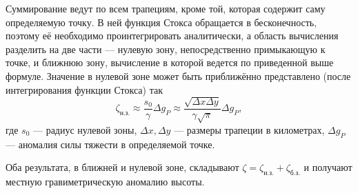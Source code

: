\documentclass[11pt, a4paper,addpoints]{exam}
\theoremstyle{remark}
\begin{document}
\begin{questions}
    Суммирование ведут по всем трапециям, кроме той, которая содержит саму определяемую точку. В ней
    функция Стокса обращается в бесконечность, поэтому её необходимо проинтегрировать аналитически,
    а область вычисления разделить на две части --- нулевую зону, непосредственно примыкающую к точке, и
    ближнюю зону, вычисление в которой ведется по приведенной выше формуле. 
    Значение в нулевой зоне может быть приближённо представлено (после интегрирования функции
    Стокса) так
    \begin{equation*}
        \zeta_{\textrm{н.з.}} \approx \dfrac{s_0}{\gamma} \Delta g_P \approx \dfrac{\sqrt{\Delta x\Delta
        y}}{\gamma \sqrt{\pi}} \Delta g_P,
    \end{equation*}
    где $s_0$ --- радиус нулевой зоны, $\Delta x, \Delta y$ --- размеры трапеции в километрах,
    $\Delta g_P$ --- аномалия силы тяжести в определяемой точке. 

    Оба результата, в ближней и нулевой зоне, складывают $\zeta = \zeta_{\textrm{н.з.}} +
    \zeta_{\textrm{б.з.}}$ и получают местную гравиметрическую аномалию высоты.
\end{questions}
\end{document}
